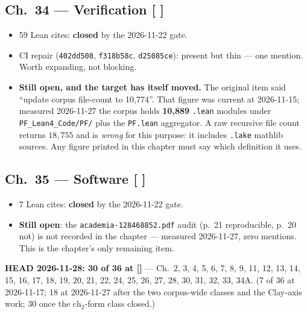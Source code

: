 \subsection*{Ch.~34 --- Verification \hfill [\,\,]}
\begin{itemize}
\item 59 Lean cites: \textbf{closed} by the 2026-11-22 gate.
\item CI repair (\texttt{402dd508}, \texttt{f318b58c}, \texttt{d25085ce}):
present but thin --- one mention. Worth expanding, not blocking.
\item \textbf{Still open, and the target has itself moved.} The original item
said ``update corpus file-count to 10{,}774''. That figure was current at
2026-11-15; measured 2026-11-27 the corpus holds \textbf{10{,}889}
\texttt{.lean} modules under \texttt{PF\_Lean4\_Code/PF/} plus the
\texttt{PF.lean} aggregator. A raw recursive file count returns $18{,}755$ and
is \emph{wrong} for this purpose: it includes \texttt{.lake} mathlib sources.
Any figure printed in this chapter must say which definition it uses.
\end{itemize}

\subsection*{Ch.~35 --- Software \hfill [\,\,]}
\begin{itemize}
\item 7 Lean cites: \textbf{closed} by the 2026-11-22 gate.
\item \textbf{Still open}: the \texttt{academia-128468852.pdf} audit
(p.~21 reproducible, p.~20 not) is not recorded in the chapter --- measured
2026-11-27, zero mentions. This is the chapter's only remaining item.
\end{itemize}

\vspace{1em}
\noindent \textbf{HEAD 2026-11-28: 30 of 36 at [\checkmark]} --- Ch.~2, 3, 4,
5, 6, 7, 8, 9, 11, 12, 13, 14, 15, 16, 17, 18, 19, 20, 21, 22, 24, 25, 26, 27,
28, 30, 31, 32, 33, 34A. (7 of 36 at 2026-11-17; 18 at 2026-11-27 after the two
corpus-wide classes and the Clay-axis work; 30 once the $\mathrm{ch}_2$-form
class closed.)

